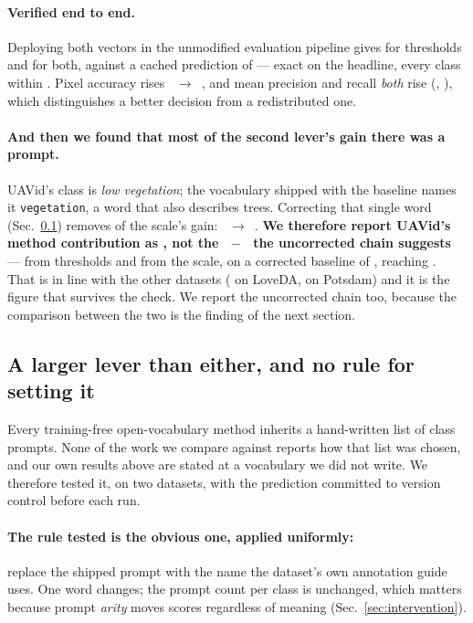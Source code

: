 \documentclass[10pt,a4paper]{article}                        %
\newcommand{\best}[1]{\textbf{#1}}
\begin{document}
\paragraph{Verified end to end.} Deploying both vectors in the unmodified evaluation
pipeline gives \uavEEone{} for thresholds and \best{\uavEEtwo{}} for both, against a
cached prediction of \uavEEpred{} --- exact on the headline, every class within
\uavEEmax{}. Pixel accuracy rises \uavaAccA{}~$\to$~\uavaAccC{}, and mean precision
and recall \emph{both} rise (\uavPrecD{}, \uavRecD{}), which distinguishes a better
decision from a redistributed one.

\paragraph{\best{And then we found that most of the second lever's gain there was a
prompt.}} UAVid's class is \emph{low vegetation}; the vocabulary shipped with the
baseline names it \texttt{vegetation}, a word that also describes trees. Correcting
that single word (Sec.~\ref{sec:vocab}) removes \uavScaleLost{} of the scale's gain:
\uavScaleTrans{}~$\to$~\uavCorrTwo{}. \best{We therefore report UAVid's method
contribution as \uavCorrMethod{}, not the \uavEEtwo{}~$-$~\uavBase{} the uncorrected
chain suggests} --- \uavCorrOne{} from thresholds and \uavCorrTwo{} from the scale,
on a corrected baseline of \uavCorrBase{}, reaching \uavCorrFinal{}. That is in line
with the other datasets (\loveTotal{} on LoveDA, \potsTotal{} on Potsdam) and it is
the figure that survives the check. We report the uncorrected chain too, because the
comparison between the two is the finding of the next section.

\subsection{A larger lever than either, and no rule for setting it}
\label{sec:vocab}

Every training-free open-vocabulary method inherits a hand-written list of class
prompts. None of the work we compare against reports how that list was chosen, and
our own results above are stated at a vocabulary we did not write. We therefore
tested it, on two datasets, with the prediction committed to version control before
each run.

\paragraph{The rule tested is the obvious one, applied uniformly:} replace the
shipped prompt with the name the dataset's own annotation guide uses. One word
changes; the prompt count per class is unchanged, which matters because prompt
\emph{arity} moves scores regardless of meaning (Sec.~\ref{sec:intervention}).
\end{document}
